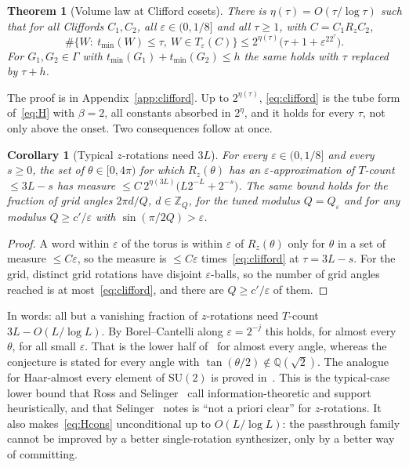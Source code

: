 \documentclass[aps,prx,twocolumn,superscriptaddress,nofootinbib,longbibliography]{revtex4-2}
\theoremstyle{plain}
\newtheorem{theorem}{Theorem}
\newtheorem{corollary}{Corollary}
\theoremstyle{definition}
\theoremstyle{remark}
\newcommand{\Z}{\mathbb{Z}}
\newcommand{\Q}{\mathbb{Q}}
\newcommand{\SU}{\mathrm{SU}(2)}
\begin{document}
\begin{theorem}[Volume law at Clifford cosets]\label{thm:clifford}
There is $\eta(\tau)=O(\tau/\log\tau)$ such that for all Cliffords $C_1,C_2$, all $\varepsilon\in(0,1/8]$ and all $\tau\ge1$, with $C=C_1R_zC_2$,
\begin{equation}\label{eq:clifford}
\#\{W:\ t_{\min}(W)\le\tau,\ W\in T_\varepsilon(C)\}\le2^{\eta(\tau)}\big(\tau+1+\varepsilon^22^\tau\big).
\end{equation}
For $G_1,G_2\in\Gamma$ with $t_{\min}(G_1)+t_{\min}(G_2)\le h$ the same holds with $\tau$ replaced by $\tau+h$.
\end{theorem}
The proof is in Appendix~\ref{app:clifford}. Up to $2^{\eta(\tau)}$, \eqref{eq:clifford} is the tube form of~\eqref{eq:H} with $\beta=2$, all constants absorbed in $2^\eta$, and it holds for every $\tau$, not only above the onset. Two consequences follow at once.

\begin{corollary}[Typical $z$-rotations need $3L$]\label{cor:typical}
For every $\varepsilon\in(0,1/8]$ and every $s\ge0$, the set of $\theta\in[0,4\pi)$ for which $R_z(\theta)$ has an $\varepsilon$-approximation of $T$-count $\le3L-s$ has measure $\le C\,2^{\eta(3L)}\big(L2^{-L}+2^{-s}\big)$. The same bound holds for the fraction of grid angles $2\pi d/Q$, $d\in\Z_Q$, for the tuned modulus $Q=Q_\varepsilon$ and for any modulus $Q\ge c'/\varepsilon$ with $\sin(\pi/2Q)>\varepsilon$.
\end{corollary}
\begin{proof}
A word within $\varepsilon$ of the torus is within $\varepsilon$ of $R_z(\theta)$ only for $\theta$ in a set of measure $\le C\varepsilon$, so the measure is $\le C\varepsilon$ times~\eqref{eq:clifford} at $\tau=3L-s$. For the grid, distinct grid rotations have disjoint $\varepsilon$-balls, so the number of grid angles reached is at most~\eqref{eq:clifford}, and there are $Q\ge c'/\varepsilon$ of them.
\end{proof}
In words: all but a vanishing fraction of $z$-rotations need $T$-count $3L-O(L/\log L)$. By Borel--Cantelli along $\varepsilon=2^{-j}$ this holds, for almost every $\theta$, for all small $\varepsilon$. That is the lower half of~\cite[Conj.~8.10]{RossSelinger} for almost every angle, whereas the conjecture is stated for every angle with $\tan(\theta/2)\notin\Q(\sqrt2)$. The analogue for Haar-almost every element of $\SU$ is proved in~\cite{SMA}. This is the typical-case lower bound that Ross and Selinger~\cite{RossSelinger} call information-theoretic and support heuristically, and that Selinger~\cite[\S9]{Selinger15} notes is ``not a priori clear'' for $z$-rotations. It also makes~\eqref{eq:Hcons} unconditional up to $O(L/\log L)$: the passthrough family cannot be improved by a better single-rotation synthesizer, only by a better way of committing.
\end{document}
